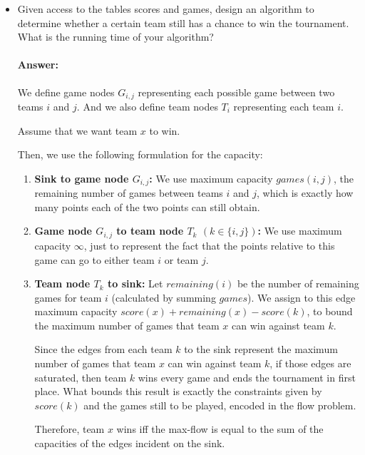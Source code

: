 \documentclass[a4paper]{article}
\begin{document}
\begin{itemize}
\item Given access to the tables scores and games, design an algorithm to determine whether a certain team still has a chance to win the tournament. What is the running time of your algorithm?

\paragraph{Answer:}

We define game nodes $G_{i,j}$ representing each possible game between two teams $i$ and $j$. And we also define team nodes $T_i$ representing each team $i$.

Assume that we want team $x$ to win.


Then, we use the following formulation for the capacity:

\begin{enumerate}
\item \textbf{Sink to game node $G_{i,j}$:} We use maximum capacity ${games}(i, j)$, the remaining number of games between teams $i$ and $j$, which is exactly how many points each of the two points can still obtain.

\item \textbf{Game node $G_{i,j}$ to team node $T_k$ $(k \in \{i,j\})$:} We use maximum capacity $\infty$, just to represent the fact that the points relative to this game can go to either team $i$ or team $j$.

\item \textbf{Team node $T_k$ to sink:} Let ${remaining}(i)$ be the number of remaining games for team $i$ (calculated by summing ${games}$). We assign to this edge  maximum capacity ${score}(x) + {remaining}(x) - {score}(k)$, to bound the maximum number of games that team $x$ can win against team $k$.

\bigskip

\noindent Since the edges from each team $k$ to the sink represent the maximum number of games that team $x$ can win against team $k$, if those edges are saturated, then team $k$ wins every game and ends the tournament in first place. What bounds this result is exactly the constraints given by ${score}(k)$ and the games still to be played, encoded in the flow problem.

Therefore, team $x$ wins iff the max-flow is equal to the sum of the capacities of the edges incident on the sink.

\end{enumerate}


\end{itemize}
\end{document}
